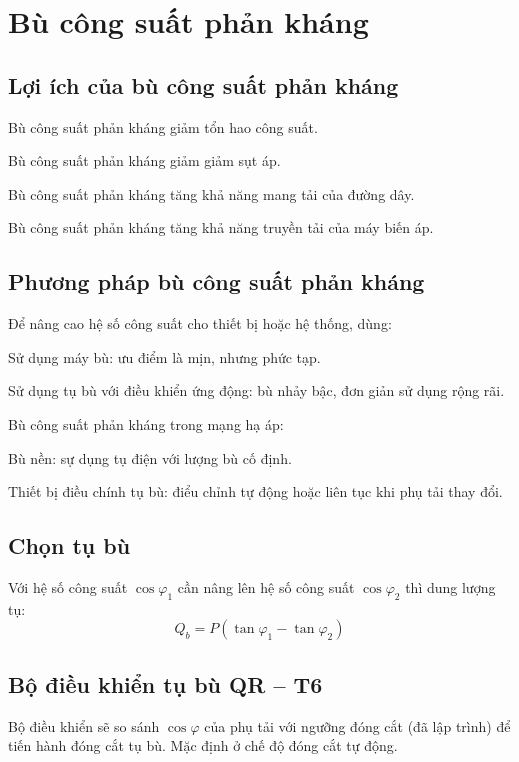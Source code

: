 \documentclass[13pt,a4paper]{extarticle}
\begin{document}
\section{Bù công suất phản kháng}
\subsection{Lợi ích của bù công suất phản kháng}
\begin{list}{--}{}
\item Bù công suất phản kháng giảm tổn hao công suất.
\item Bù công suất phản kháng giảm giảm sụt áp.
\item Bù công suất phản kháng tăng khả năng mang tải của đường dây.
\item Bù công suất phản kháng tăng khả năng truyền tải của máy biến áp.
\end{list}
\subsection{Phương pháp bù công suất phản kháng}
Để nâng cao hệ số công suất cho thiết bị hoặc hệ thống, dùng:
\begin{list}{--}{}
\item Sử dụng máy bù: ưu điểm là mịn, nhưng phức tạp.
\item Sử dụng tụ bù với điều khiển ứng động: bù nhảy bậc, đơn giản sử dụng rộng rãi.
\end{list}

Bù công suất phản kháng trong mạng hạ áp:
\begin{list}{--}{}
\item Bù nền: sự dụng tụ điện với lượng bù cố định.
\item Thiết bị điều chính tụ bù: điểu chỉnh tự động hoặc liên tục khi phụ tải thay đổi.
\end{list}
\subsection{Chọn tụ bù}
Với hệ số công suất $\cos \varphi _1$ cần nâng lên hệ số công suất $\cos \varphi _2$ thì dung lượng tụ: $$ Q_{b} = P \left({\tan \varphi_1 - \tan \varphi_2}\right)$$
\subsection{Bộ điều khiển tụ bù QR -- T6}
Bộ điều khiển sẽ so sánh $\cos \varphi$ của phụ tải với ngưỡng đóng cắt (đã lập trình) để tiến hành đóng cắt tụ bù. Mặc định ở chế độ đóng cắt tự động.
\end{document}
